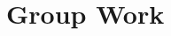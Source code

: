 \documentclass[noauthor,handout]{ximera}
\renewcommand{\vec}[1]{{\overset{\boldsymbol{\rightharpoonup}}{\mathbf{#1}}}}
\begin{document}

%
%


\section{Group Work}
\end{document}
